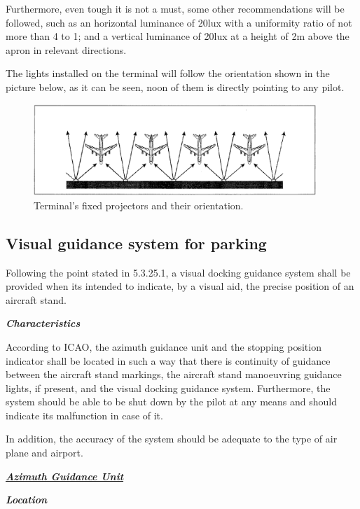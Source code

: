		Furthermore, even tough it is not a must, some other recommendations will be followed, such as an horizontal luminance of 20lux with a uniformity ratio of not more than 4 to 1; and a vertical luminance of 20lux at a height of 2m above the apron in relevant directions. 
		
		The lights installed on the terminal will follow the orientation shown in the picture below, as it can be seen, noon of them is directly pointing to any pilot.
		
		\begin{figure}[H]
			\centering
			\includegraphics[clip, trim=0.3cm 0.3cm 0.3cm 0.3cm, width=0.95\textwidth]{./images/lights/apronlights}
			\caption{Terminal's fixed projectors and their orientation.} %
			\label{} %
		\end{figure}
		
		
		\subsection{Visual guidance system for parking}
		Following the point stated in 5.3.25.1, a visual docking guidance system shall be provided when its intended to indicate, by a visual aid, the precise position of an aircraft stand. 
		
		\textbf{\textit{Characteristics}}
		
		According to ICAO, the azimuth guidance unit and the stopping position indicator shall be located in such a way that there is continuity of guidance between the aircraft stand markings, the aircraft stand manoeuvring guidance lights, if present, and the visual docking guidance system. Furthermore, the system should be able to be shut down by the pilot at any means and should indicate its malfunction in case of it.
		
		In addition, the accuracy of the system should be adequate to the type of air plane and airport.
		
		\underline{\textbf{\textit{Azimuth Guidance Unit}}}
		
		\textbf{\textit{Location}}
		
